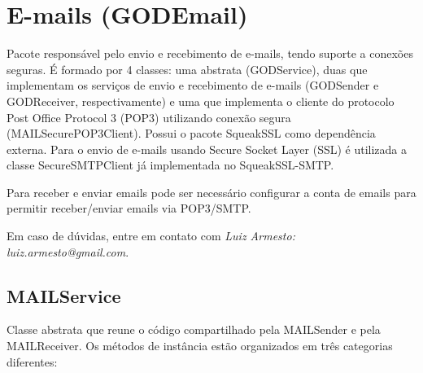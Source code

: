 \section{E-mails (GODEmail)}

Pacote responsável pelo envio e recebimento de e-mails, tendo suporte a conexões seguras. É formado por 4 classes: uma abstrata (GODService), duas que implementam os serviços de envio e recebimento de e-mails (GODSender e GODReceiver, respectivamente) e uma que implementa o cliente do protocolo Post Office Protocol 3 (POP3) utilizando conexão segura (MAILSecurePOP3Client). Possui o pacote SqueakSSL como dependência externa. Para o envio de e-mails usando Secure Socket Layer (SSL) é utilizada a classe SecureSMTPClient já implementada no SqueakSSL-SMTP.

Para receber e enviar emails pode ser necessário configurar a conta de emails para permitir receber/enviar emails via POP3/SMTP.

Em caso de dúvidas, entre em contato com \emph{Luiz Armesto: luiz.armesto@gmail.com}.

\subsection{MAILService}

Classe abstrata que reune o código compartilhado pela MAILSender e pela MAILReceiver. Os métodos de instância estão organizados em três categorias diferentes:

